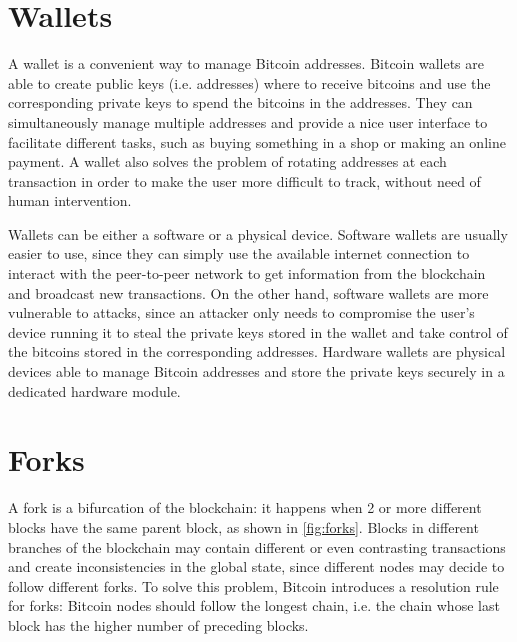 \section{Wallets}
A wallet is a convenient way to manage Bitcoin addresses.
Bitcoin wallets are able to create public keys (i.e. addresses) where to receive bitcoins and use the corresponding private keys to spend the bitcoins in the addresses.
They can simultaneously manage multiple addresses and provide a nice user interface to facilitate different tasks, such as buying something in a shop or making an online payment.
A wallet also solves the problem of rotating addresses at each transaction in order to make the user more difficult to track, without need of human intervention.

Wallets can be either a software or a physical device.
Software wallets are usually easier to use, since they can simply use the available internet connection to interact with the peer-to-peer network to get information from the blockchain and broadcast new transactions.
On the other hand, software wallets are more vulnerable to attacks, since an attacker only needs to compromise the user's device running it to steal the private keys stored in the wallet and take control of the bitcoins stored in the corresponding addresses.
Hardware wallets are physical devices able to manage Bitcoin addresses and store the private keys securely in a dedicated hardware module.

\section{Forks}
A fork is a bifurcation of the blockchain:
it happens when \num{2} or more different blocks have the same parent block, as shown in \cref{fig:forks}.
Blocks in different branches of the blockchain may contain different or even contrasting transactions and create inconsistencies in the global state, since different nodes may decide to follow different forks.
To solve this problem, Bitcoin introduces a resolution rule for forks:
Bitcoin nodes should follow the longest chain, i.e. the chain whose last block has the higher number of preceding blocks.

